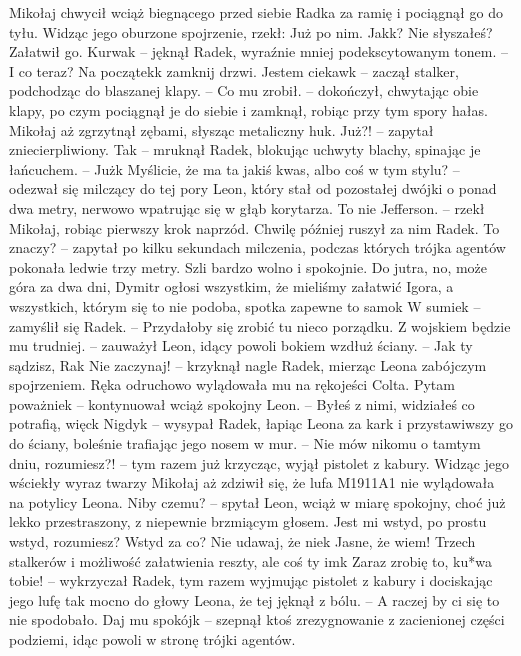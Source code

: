 \documentclass[../MAIN.tex]{subfiles}
\begin{document}
Mikołaj chwycił wciąż biegnącego przed siebie Radka za ramię i pociągnął go do tyłu. Widząc jego oburzone spojrzenie, rzekł:
\sx Już po nim.
\xx Jak\3k?
\xx Nie słyszałeś? Załatwił go.
\xx Kurwa\3k -- jęknął Radek, wyraźnie mniej podekscytowanym tonem. -- I co teraz?
\xx Na początek\3k zamknij drzwi.
\xx Jestem ciekaw\3k -- zaczął stalker, podchodząc do blaszanej klapy. -- Co mu zrobił. -- dokończył, chwytając obie klapy, po czym pociągnął je do siebie i zamknął, robiąc przy tym spory hałas. Mikołaj aż zgrzytnął zębami, słysząc metaliczny huk.
\xx Już?! -- zapytał zniecierpliwiony.
\xx Ta\3k -- mruknął Radek, blokując uchwyty blachy, spinając je łańcuchem. -- Już\3k
\xx Myślicie, że ma ta jakiś kwas, albo coś w tym stylu? -- odezwał się milczący do tej pory Leon, który stał od pozostałej dwójki o ponad dwa metry, nerwowo wpatrując się w głąb korytarza.
\xx To nie Jefferson. -- rzekł Mikołaj, robiąc pierwszy krok naprzód. Chwilę później ruszył za nim Radek.
\xx To znaczy? -- zapytał po kilku sekundach milczenia, podczas których trójka agentów pokonała ledwie trzy metry. Szli bardzo wolno i spokojnie.
\xx Do jutra, no, może góra za dwa dni, Dymitr ogłosi wszystkim, że mieliśmy załatwić Igora, a wszystkich, którym się to nie podoba, spotka zapewne to samo\3k
\xx W sumie\3k -- zamyślił się Radek. -- Przydałoby się zrobić tu nieco porządku.
\xx Z wojskiem będzie mu trudniej. -- zauważył Leon, idący powoli bokiem wzdłuż ściany. -- Jak ty sądzisz, Ra\3k
\xx Nie zaczynaj! -- krzyknął nagle Radek, mierząc Leona zabójczym spojrzeniem. Ręka odruchowo wylądowała mu na rękojeści Colta.
\xx Pytam poważnie\3k -- kontynuował wciąż spokojny Leon. -- Byłeś z nimi, widziałeś co potrafią, więc\3k
\xx Nigdy\3k -- wysypał Radek, łapiąc Leona za kark i przystawiwszy go do ściany, boleśnie trafiając jego nosem w mur. -- Nie mów nikomu o tamtym dniu, rozumiesz?! -- tym razem już krzycząc, wyjął pistolet z kabury. Widząc jego wściekły wyraz twarzy Mikołaj aż zdziwił się, że lufa M1911A1 nie wylądowała na potylicy Leona.
\xx Niby czemu? -- spytał Leon, wciąż w miarę spokojny, choć już lekko przestraszony, z niepewnie brzmiącym głosem.
\xx Jest mi wstyd, po prostu wstyd, rozumiesz?
\xx Wstyd za co?
\xx Nie udawaj, że nie\3k
\xx Jasne, że wiem! Trzech stalkerów i możliwość załatwienia reszty, ale coś ty im\3k
\xx Zaraz zrobię to, ku*wa tobie! -- wykrzyczał Radek, tym razem wyjmując pistolet z kabury i dociskając jego lufę tak mocno do głowy Leona, że tej jęknął z bólu. -- A raczej by ci się to nie spodobało.
\xx Daj mu spokój\3k -- szepnął ktoś zrezygnowanie z zacienionej części podziemi, idąc powoli w stronę trójki agentów.
\end{document}
